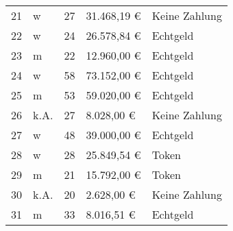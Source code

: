 \begin{table}[H]
\begin{tabular}{lllll}
21                                 & w                                        & 27                                  & 31.468,19 €                             & Keine Zahlung                         \\
22                                 & w                                        & 24                                  & 26.578,84 €                             & Echtgeld                              \\
23                                 & m                                        & 22                                  & 12.960,00 €                             & Echtgeld                              \\
24                                 & w                                        & 58                                  & 73.152,00 €                             & Echtgeld                              \\
25                                 & m                                        & 53                                  & 59.020,00 €                             & Echtgeld                              \\
26                                 & k.A.                                     & 27                                  & 8.028,00 €                              & Keine Zahlung                         \\
27                                 & w                                        & 48                                  & 39.000,00 €                             & Echtgeld                              \\
28                                 & w                                        & 28                                  & 25.849,54 €                             & Token                                 \\
29                                 & m                                        & 21                                  & 15.792,00 €                             & Token                                 \\
30                                 & k.A.                                     & 20                                  & 2.628,00 €                              & Keine Zahlung                         \\
31                                 & m                                        & 33                                  & 8.016,51 €                              & Echtgeld                              \\

\end{tabular}
\end{table}
